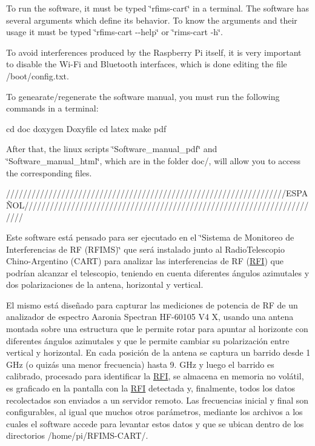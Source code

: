 To run the software, it must be typed \char`\"{}rfims-\/cart\char`\"{} in a terminal. The software has several arguments which define its behavior. To know the arguments and their usage it must be typed \char`\"{}rfims-\/cart -\/-\/help\char`\"{} or \char`\"{}rims-\/cart -\/h\char`\"{}.

To avoid interferences produced by the Raspberry Pi itself, it is very important to disable the Wi-\/\+Fi and Bluetooth interfaces, which is done editing the file /boot/config.txt.

To genearate/regenerate the software manual, you must run the following commands in a terminal\+: \begin{DoxyVerb}cd doc
doxygen Doxyfile
cd latex
make pdf
\end{DoxyVerb}


After that, the linux scripts \char`\"{}\+Software\+\_\+manual\+\_\+pdf\char`\"{} and \char`\"{}\+Software\+\_\+manual\+\_\+html\char`\"{}, which are in the folder doc/, will allow you to access the corresponding files.

//////////////////////////////////////////////////////////////////\+E\+S\+P\+AÑ\+O\+L///////////////////////////////////////////////////////////////////////

Este software está pensado para ser ejecutado en el \char`\"{}\+Sistema de Monitoreo de Interferencias de R\+F (\+R\+F\+I\+M\+S)\char`\"{} que será instalado junto al Radio\+Telescopio Chino-\/\+Argentino (C\+A\+RT) para analizar las interferencias de RF (\hyperlink{structRFI}{R\+FI}) que podrían alcanzar el telescopio, teniendo en cuenta diferentes ángulos azimutales y dos polarizaciones de la antena, horizontal y vertical.

El mismo está diseñado para capturar las mediciones de potencia de RF de un analizador de espectro Aaronia Spectran H\+F-\/60105 V4 X, usando una antena montada sobre una estructura que le permite rotar para apuntar al horizonte con diferentes ángulos azimutales y que le permite cambiar su polarización entre vertical y horizontal. En cada posición de la antena se captura un barrido desde 1 G\+Hz (o quizás una menor frecuencia) hasta 9. G\+Hz y luego el barrido es calibrado, procesado para identificar la \hyperlink{structRFI}{R\+FI}, se almacena en memoria no volátil, es graficado en la pantalla con la \hyperlink{structRFI}{R\+FI} detectada y, finalmente, todos los datos recolectados son enviados a un servidor remoto. Las frecuencias inicial y final son configurables, al igual que muchos otros parámetros, mediante los archivos a los cuales el software accede para levantar estos datos y que se ubican dentro de los directorios /home/pi/\+R\+F\+I\+M\+S-\/\+C\+A\+R\+T/.


